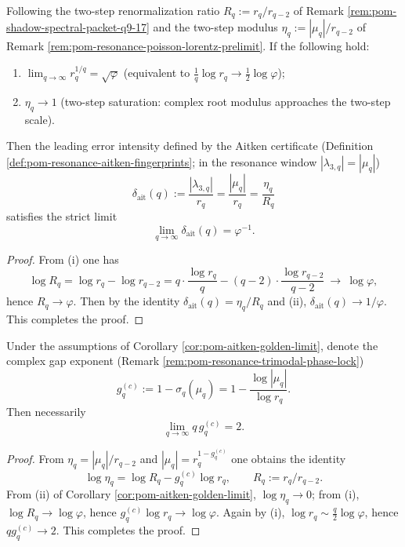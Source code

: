 \begin{corollary}\label{cor:pom-aitken-golden-limit}
Following the two-step renormalization ratio \(R_q:=r_q/r_{q-2}\) of Remark \ref{rem:pom-shadow-spectral-packet-q9-17} and the two-step modulus
\(
\eta_q:=|\mu_q|/r_{q-2}
\)
of Remark \ref{rem:pom-resonance-poisson-lorentz-prelimit}.
If the following hold:
\begin{enumerate}
  \item[(i)] \(\lim_{q\to\infty} r_q^{1/q}=\sqrt{\varphi}\) (equivalent to \(\frac{1}{q}\log r_q\to \tfrac12\log\varphi\));
  \item[(ii)] \(\eta_q\to 1\) (two-step saturation: complex root modulus approaches the two-step scale).
\end{enumerate}
Then the leading error intensity defined by the Aitken certificate (Definition \ref{def:pom-resonance-aitken-fingerprints}; in the resonance window \(|\lambda_{3,q}|=|\mu_q|\))
\[
\delta_{\mathrm{ait}}(q):=\frac{|\lambda_{3,q}|}{r_q}=\frac{|\mu_q|}{r_q}=\frac{\eta_q}{R_q}
\]
satisfies the strict limit
\[
\lim_{q\to\infty}\delta_{\mathrm{ait}}(q)=\varphi^{-1}.
\]
\end{corollary}
\begin{proof}
From (i) one has
\[
\log R_q=\log r_q-\log r_{q-2}
=q\cdot\frac{\log r_q}{q}-(q-2)\cdot\frac{\log r_{q-2}}{q-2}\ \longrightarrow\ \log\varphi,
\]
hence \(R_q\to\varphi\).
Then by the identity \(\delta_{\mathrm{ait}}(q)=\eta_q/R_q\) and (ii), \(\delta_{\mathrm{ait}}(q)\to 1/\varphi\). This completes the proof.
\end{proof}

\begin{corollary}[Resonance saturation \texorpdfstring{$\Rightarrow$}{=>} \texorpdfstring{$2/q$}{2/q} scaling law of the complex gap exponent]\label{cor:pom-resonance-complex-gap-2overq}
Under the assumptions of Corollary \ref{cor:pom-aitken-golden-limit}, denote the complex gap exponent (Remark \ref{rem:pom-resonance-trimodal-phase-lock})
\[
g_q^{(c)}:=1-\sigma_q(\mu_q)=1-\frac{\log|\mu_q|}{\log r_q}.
\]
Then necessarily
\[
\lim_{q\to\infty}q\,g_q^{(c)}=2.
\]
\end{corollary}
\begin{proof}
From \(\eta_q=|\mu_q|/r_{q-2}\) and \(|\mu_q|=r_q^{1-g_q^{(c)}}\) one obtains the identity
\[
\log\eta_q=\log R_q-g_q^{(c)}\log r_q,
\qquad R_q:=r_q/r_{q-2}.
\]
From (ii) of Corollary \ref{cor:pom-aitken-golden-limit}, \(\log\eta_q\to 0\); from (i), \(\log R_q\to\log\varphi\), hence
\(
g_q^{(c)}\log r_q\to\log\varphi
\).
Again by (i), \(\log r_q\sim \frac{q}{2}\log\varphi\), hence \(qg_q^{(c)}\to 2\). This completes the proof.
\end{proof}

